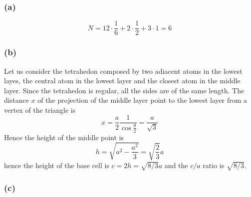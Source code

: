 \subsubsection*{(a)}
$$N = 12 \cdot \frac{1}{6} + 2 \cdot \frac{1}{2} + 3 \cdot 1 = 6$$
\subsubsection*{(b)}
Let us consider the tetrahedon composed by two adiacent atoms in the lowest layes, the central atom in the lowest layer and the closest atom in the middle layer.
Since the tetrahedon is regular, all the sides are of the same length. The distance $x$ of the projection of the middle layer point to the lowest layer from a vertex of the triangle is 
$$x = \frac{a}{2}\frac{1}{\cos\frac{\theta}{2}} = \frac{a}{\sqrt{3}}$$
Hence the  height of the middle point is 
$$h = \sqrt{a^2 - \frac{a^2}{3}} = \sqrt{\frac{2}{3}}a$$ hence the height of the base cell is $c = 2h = \sqrt{8/3}a$ and the $c/a$ ratio is $\sqrt{8/3}$.
\subsubsection*{(c)}
